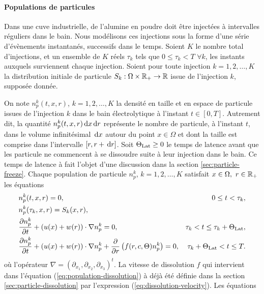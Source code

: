 \paragraph{Populations de particules}
Dans une cuve industrielle, de l'alumine en poudre doit être injectées
à intervalles réguliers dans le bain. Nous modélisons ces injections
sous la forme d'une série d'évènements instantanés, successifs dans le
temps. Soient $K$ le nombre total d'injections, et un ensemble de $K$
réels $\tau_k$ tels que $0\leq \tau_k < T$ $\forall k$, les instants
auxquels surviennent chaque injection. Soient pour toute injection $k
= 1,2, \dots, K$ la distribution initiale de particule
$S_k:\Omega\times\mathbb R_+\to\mathbb R$ issue de l'injection $k$,
supposée donnée.

On note $n_p^k(t, x, r)$, $k = 1, 2, \dots, K$ la densité en taille et
en espace de particule issues de l'injection $k$ dans le bain
électrolytique à l'instant $t \in [0, T]$. Autrement dit, la quantité
$n_p^k(t, x, r)\,\mathrm dx\,\mathrm dr$ représente le nombre de particule, à
l'instant $t$, dans le volume infinitésimal $\,\mathrm dx$ autour du point
$x\in\Omega$ et dont la taille est comprise dans l'intervalle $[r,
  r+\,\mathrm dr]$. Soit $\Theta_\text{Lat} \geq 0$ le temps de latence avant que les
particule ne commencent à se dissoudre suite à leur injection dans le
bain. Ce temps de latence à fait l'objet d'une discussion dans la
section \ref{sec:particle-freeze}. Chaque population de particule
$n_p^k$, $k = 1, 2,\dots, K$ satisfait $x\in\Omega,\ r\in\mathbb R_+$ les
équations
\begin{align}
  &n_p^k(t, x, r) = 0, & 0\leq t < \tau_k,\label{eq:population-pre-injection}\\
  &n_p^k(\tau_k, x, r) = S_k(x, r),\label{eq:population-injection}\\
  &\frac{\partial n_p^k}{\partial t} + (u(x) + w(r))\cdot \nabla n_p^k
  = 0, &\tau_k < t \leq \tau_k +
  \Theta_\text{Lat},\label{eq:population-transport}\\
  &\frac{\partial n_p^k}{\partial t} + (u(x) + w(r))\cdot \nabla n_p^k
  + \frac{\partial}{\partial r} \left( f(r, c,
    \Theta) n_p^k \right) = 0, &\tau_k + \Theta_\text{Lat} < t \leq T.\label{eq:population-dissolution}
\end{align}
où l'opérateur $\nabla = (\partial_{x_1}, \partial_{x_2},
\partial_{x_3})^t$. La vitesse de dissolution $f$ qui intervient dans
l'équation (\ref{eq:population-dissolution}) à déjà été définie dans
la section \ref{sec:particle-dissolution} par l'expression
(\ref{eq:dissolution-velocity}). Les équations
